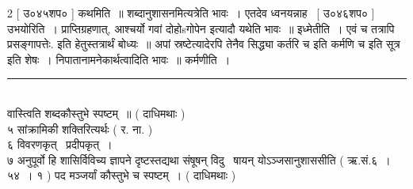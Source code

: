 \documentclass[11pt, openany]{book}
\begin{document}
\begin{multicols}{2}
 [ उ०४५शप० ] कथमिति~॥ शब्दानुशासनमित्यत्रेति भावः~। एतदेव ध्वनयन्नाह \textendash\ [ उ०४६शप० ] उभयोरिति~। प्राप्तिग्रहणात्, आश्चर्यो गवां दोहोsगोपेन इत्यादौ यथेति भावः~॥ इध्मेतीति~। एवं च तत्रापि प्रसङ्गापत्तेः. इति हेतुस्तत्रार्थं बोध्यः~॥ अपां स्रष्टेत्यादेरपि तेनैव सिद्ध्या {\qt कर्तरि च} इति {\qt कर्मणि च} इति सूत्र इति शेषः~। निपातानामनेकार्थत्वादिति भावः~॥ कर्मणीति~।

\noindent
\rule{1\linewidth}{0.5pt}\\

\noindent
वास्त्विति शब्दकौस्तुभे स्पष्टम्~॥ ( दाधिमथाः ) \\

५ सांक्रामिकी शक्तिरित्यर्थः ( र. ना. ) \\

६ विवरणकृत् \textendash\ प्रदीपकृत्~। \\

७ अनुपूर्वो हि शासिर्विविच्य ज्ञापने दृष्टस्तद्यथा संषूषन् विदु \textendash\ षायन् योऽञ्जसानुशाससीति ( ऋ.सं.६~। ५४~। १ ) पद मञ्जर्यां कौस्तुभे च स्पष्टम्~। ( दाधिमथाः ) 
\end{multicols}

\newpage
\end{document}

